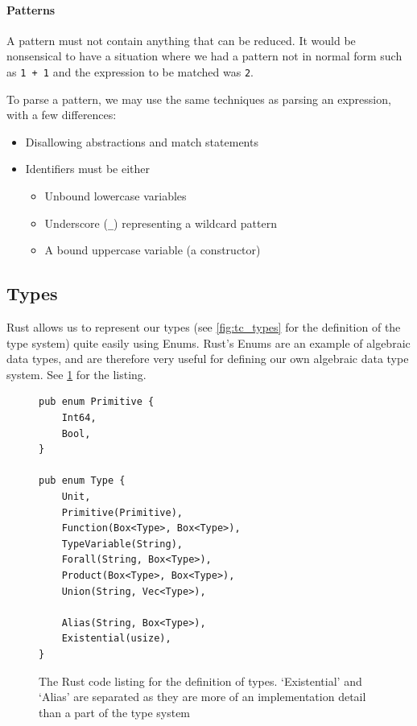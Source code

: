 \paragraph{Patterns}
\label{impl:parsing_patterns}
A pattern must not contain anything that can be reduced. It would be nonsensical to have a situation where we had a pattern not in normal form such as \verb|1 + 1| and the expression to be matched was \verb|2|. 

To parse a pattern, we may use the same techniques as parsing an expression, with a few differences:
\begin{itemize}
    \item Disallowing abstractions and match statements
    \item Identifiers must be either
    \begin{itemize}
        \item Unbound lowercase variables
        \item Underscore (\verb|_|) representing a wildcard pattern
        \item A bound uppercase variable (a constructor)
    \end{itemize}
\end{itemize}

\subsection{Types}

Rust allows us to represent our types (see \ref{fig:tc_types} for the definition of the type system) quite easily using Enums. Rust's Enums are an example of algebraic data types, and are therefore very useful for defining our own algebraic data type system. See \ref{fig:type_lst} for the listing. 

\begin{figure}[ht]
    \begin{lstlisting}[language=Rust_boxed]
pub enum Primitive {
    Int64,
    Bool,
}

pub enum Type {
    Unit,
    Primitive(Primitive),
    Function(Box<Type>, Box<Type>),
    TypeVariable(String),
    Forall(String, Box<Type>),
    Product(Box<Type>, Box<Type>),
    Union(String, Vec<Type>),

    Alias(String, Box<Type>),
    Existential(usize),
}
\end{lstlisting}
    \caption{The Rust code listing for the definition of types. `Existential' and `Alias' are separated as they are more of an implementation detail than a part of the type system}
    \label{fig:type_lst}
\end{figure}

